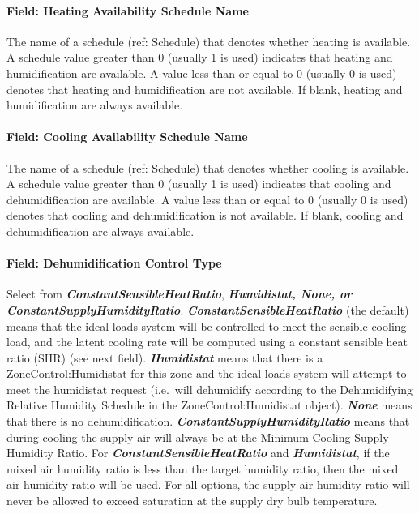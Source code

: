 \paragraph{Field: Heating Availability Schedule Name}\label{field-heating-availability-schedule-name-001}

The name of a schedule (ref: Schedule) that denotes whether heating is available. A schedule value greater than 0 (usually 1 is used) indicates that heating and humidification are available. A value less than or equal to 0 (usually 0 is used) denotes that heating and humidification are not available. If blank, heating and humidification are always available.

\paragraph{Field: Cooling Availability Schedule Name}\label{field-cooling-availability-schedule-name-001}

The name of a schedule (ref: Schedule) that denotes whether cooling is available. A schedule value greater than 0 (usually 1 is used) indicates that cooling and dehumidification are available. A value less than or equal to 0 (usually 0 is used) denotes that cooling and dehumidification is not available. If blank, cooling and dehumidification are always available.

\paragraph{Field: Dehumidification Control Type}\label{field-dehumidification-control-type-002}

Select from \textbf{\emph{ConstantSensibleHeatRatio}}, \textbf{\emph{Humidistat, None, or ConstantSupplyHumidityRatio}}. \textbf{\emph{ConstantSensibleHeatRatio}} (the default) means that the ideal loads system will be controlled to meet the sensible cooling load, and the latent cooling rate will be computed using a constant sensible heat ratio (SHR) (see next field). \textbf{\emph{Humidistat}} means that there is a ZoneControl:Humidistat for this zone and the ideal loads system will attempt to meet the humidistat request (i.e.~will dehumidify according to the Dehumidifying Relative Humidity Schedule in the ZoneControl:Humidistat object). \textbf{\emph{None}} means that there is no dehumidification. \textbf{\emph{ConstantSupplyHumidityRatio}} means that during cooling the supply air will always be at the Minimum Cooling Supply Humidity Ratio. For \textbf{\emph{ConstantSensibleHeatRatio}} and \textbf{\emph{Humidistat}}, if the mixed air humidity ratio is less than the target humidity ratio, then the mixed air humidity ratio will be used. For all options, the supply air humidity ratio will never be allowed to exceed saturation at the supply dry bulb temperature.

